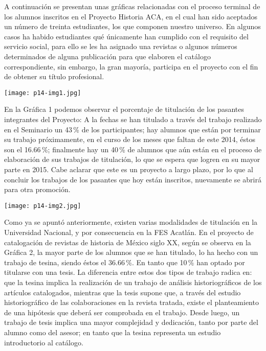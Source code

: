 A continuación se presentan unas gráficas relacionadas con el proceso
terminal de los alumnos inscritos en el Proyecto Historia ACA, en el cual
han sido aceptados un número de treinta estudiantes, los que componen
nuestro universo. En algunos casos ha habido estudiantes qué únicamente han
cumplido con el requisito del servicio social, para ello se les ha asignado
una revistas o algunos números determinados de alguna publicación para que
elaboren el catálogo correspondiente, sin embargo, la gran mayoría,
participa en el proyecto con el fin de obtener su título profesional.

\bigskip
\begin{center} 
\texttt{[image: p14-img1.jpg]} 
\end{center}

\enlargethispage{1\baselineskip}
En la Gráfica 1 podemos observar el porcentaje de titulación de los
pasantes integrantes del Proyecto: A la fechas se han titulado a través del
trabajo realizado en el Seminario un 43\,\% de los participantes; hay alumnos
que están por terminar su trabajo próximamente, en el curso de los meses
que faltan de este 2014, éstos son el 16.66\,\%; finalmente hay un 40\,\% de
alumnos que aún están en el proceso de elaboración de sus trabajos de
titulación, lo que se espera que logren en su mayor parte en 2015. Cabe
aclarar que este es un proyecto a largo plazo, por lo que al concluir los
trabajos de los pasantes que hoy están inscritos, nuevamente se abrirá para
otra promoción. 

\bigskip
\texttt{[image: p14-img2.jpg]} 

Como ya se apuntó anteriormente, existen varias modalidades de titulación en
la Universidad Nacional, y por consecuencia en la FES Aca\-tlán. En el
proyecto de catalogación de revistas de historia de México siglo XX, según
se observa en la Gráfica 2, la  mayor parte de los alumnos  que se
han titulado, lo ha hecho con un trabajo de tesina, siendo éstos el
36.66\,\%.  En tanto que 10\,\% han optado por titularse con una tesis. La
diferencia entre estos dos tipos de trabajo radica en: que la tesina
implica la realización de un trabajo de análisis historiográficos de los
artículos catalogados, mientras que la tesis supone que, a través del
estudio historiográfico de las colaboraciones en la revista tratada, existe
el planteamiento de una hipótesis que deberá ser comprobada en el trabajo.
Desde luego, un trabajo de tesis implica una mayor complejidad y
dedicación, tanto por parte del alumno como del asesor; en tanto que la
tesina representa un estudio introductorio al catálogo.

